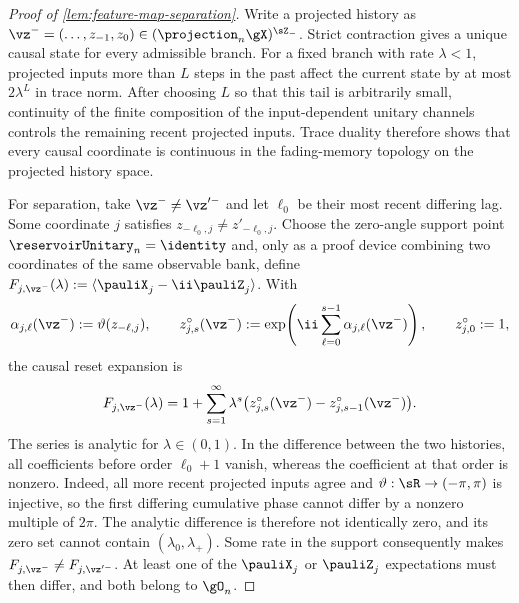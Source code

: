 \begin{proof}[Proof of \cref{lem:feature-map-separation}]
Write a projected history as
$\vz^-=(\ldots,z_{-1},z_0)\in(\projection_n\gX)^{\sZ_-}$.  Strict
contraction gives a unique causal state for every admissible branch.  For a
fixed branch with rate $\lambda<1$, projected inputs more than $L$ steps in the
past affect the current state by at most $2\lambda^L$ in trace norm.  After
choosing $L$ so that this tail is arbitrarily small, continuity of the finite
composition of the input-dependent unitary channels controls the remaining
recent projected inputs.  Trace duality therefore shows that every causal
coordinate is continuous in the fading-memory topology on the projected
history space.

For separation, take $\vz^-\neq\vz'^{-}$ and let $\ell_0$ be their most recent
differing lag.  Some coordinate $j$ satisfies
$z_{-\ell_0,j}\neq z'_{-\ell_0,j}$.  Choose the zero-angle support point
$\reservoirUnitary_n=\identity$ and, only as a proof device combining two
coordinates of the same observable bank, define
$F_{j,\vz^-}(\lambda):=\langle\pauliX_j-\ii\pauliZ_j\rangle$.  With
\[
    \alpha_{j,\ell}(\vz^-):=\vartheta(z_{-\ell,j}),
    \qquad
    z_{j,s}^{\circ}(\vz^-):=
    \exp\!\left(\ii\sum_{\ell=0}^{s-1}\alpha_{j,\ell}(\vz^-)\right),
    \qquad z_{j,0}^{\circ}:=1,
\]
the causal reset expansion is
\begin{equation}
    F_{j,\vz^-}(\lambda)
    =1+\sum_{s=1}^{\infty}\lambda^s
      \bigl(z_{j,s}^{\circ}(\vz^-)-z_{j,s-1}^{\circ}(\vz^-)\bigr).
    \label{eq:causal-memory-series}
\end{equation}
The series is analytic for $\lambda\in(0,1)$.  In the difference between the
two histories, all coefficients before order $\ell_0+1$ vanish, whereas the
coefficient at that order is nonzero.  Indeed, all more recent projected inputs
agree and $\vartheta:\sR\to(-\pi,\pi)$ is injective, so the first differing
cumulative phase cannot differ by a nonzero multiple of $2\pi$.  The analytic
difference is therefore not identically zero, and its zero set cannot contain
$(\lambda_0,\lambda_+)$.  Some rate in the support consequently makes
$F_{j,\vz^-}\neq F_{j,\vz'^{-}}$.  At least one of the $\pauliX_j$ or
$\pauliZ_j$ expectations must then differ, and both belong to $\gO_n$.
\end{proof}

